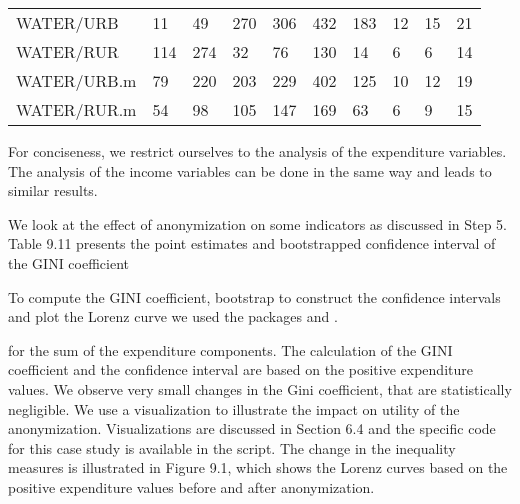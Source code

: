 \documentclass[letterpaper,10pt,english]{sphinxmanual}
\begin{document}
\begin{savenotes}\sphinxattablestart
\centering
\begin{tabulary}{\linewidth}[t]{|T|T|T|T|T|T|T|T|T|T|}
\hline
\sphinxstyletheadfamily &\sphinxstyletheadfamily 
{}
&\sphinxstyletheadfamily 
{}
&\sphinxstyletheadfamily 
{}
&\sphinxstyletheadfamily 
{}
&\sphinxstyletheadfamily 
{}
&\sphinxstyletheadfamily 
{}
&\sphinxstyletheadfamily 
{}
&\sphinxstyletheadfamily 
{}
&\sphinxstyletheadfamily 
{}
\\
\hline
WATER/URB
&
11
&
49
&
270
&
306
&
432
&
183
&
12
&
15
&
21
\\
\hline
WATER/RUR
&
114
&
274
&
32
&
76
&
130
&
14
&
6
&
6
&
14
\\
\hline
WATER/URB.m
&
79
&
220
&
203
&
229
&
402
&
125
&
10
&
12
&
19
\\
\hline
WATER/RUR.m
&
54
&
98
&
105
&
147
&
169
&
63
&
6
&
9
&
15
\\
\hline
\end{tabulary}
\par
\sphinxattableend\end{savenotes}

For conciseness, we restrict ourselves to the analysis of the
expenditure variables. The analysis of the income variables can be done
in the same way and leads to similar results.

We look at the effect of anonymization on some indicators as discussed
in Step 5. Table 9.11 presents the point estimates and bootstrapped
confidence interval of the GINI coefficient %
\begin{footnote}[3]\sphinxAtStartFootnote
To compute the GINI coefficient, bootstrap to construct the
confidence intervals and plot the Lorenz curve we used the 
packages  and .
%
\end{footnote} for
the sum of the expenditure components. The calculation of the GINI
coefficient and the confidence interval are based on the positive
expenditure values. We observe very small changes in the Gini
coefficient, that are statistically negligible. We use a visualization
to illustrate the impact on utility of the anonymization. Visualizations
are discussed in Section 6.4 and the specific  code for this case
study is available in the  script. The change in the inequality
measures is illustrated in Figure 9.1, which shows the Lorenz curves
based on the positive expenditure values before and after anonymization.
\end{document}
